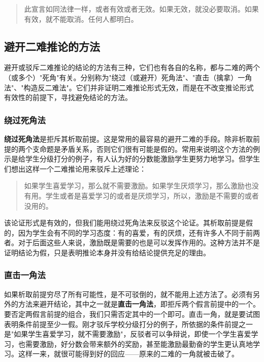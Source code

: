 \begin{quote}
此宣言如同法律一样，或者有效或者无效。如果无效，就没必要取消。如果有效，就不能取消。任何人都明白。\cite{lincoln1861}
\end{quote}

\subsection{避开二难推论的方法}

避开或驳斥二难推论的结论的方法有三种，它们也有各自的名称，都与二难的两个（或多个）"死角"有关。分别称为"绕过（或避开）死角法"、"直击（擒拿）一角法"、"构造反二难法"。它们并非证明二难推论形式无效，而是在不改变推论形式有效性的前提下，寻找避免结论的方法。

\subsubsection{绕过死角法}

\textbf{绕过死角法}是拒斥其析取前提。这是常用的最容易的避开二难的手段。除非析取前提的两个支命题是矛盾关系，否则它们很有可能是假的。常用来说明这个方法的例示是给学生分级打分的例子，有人认为好的分数能激励学生更努力地学习。但学生们想出这样一个二难推论用来驳斥上述理论：

\begin{quote}
如果学生喜爱学习，那么就不需要激励。如果学生厌烦学习，那么激励也没有用。学生或者是喜爱学习的或者是厌烦学习，所以，激励是不需要的或者没用的。
\end{quote}

该论证形式是有效的，但我们能用绕过死角法来反驳这个论证。其析取前提是假的，因为学生会有不同的学习态度：有的喜爱，有的厌烦，还有许多人不同于前两者。对于后面这些人来说，激励既是需要的也是可以发挥作用的。这种方法并不是证明结论为假，只是表明推论本身并没有给结论提供充足的理由。

\subsubsection{直击一角法}

如果析取前提穷尽了所有可能性，是不可驳倒的，就不能用上述方法了。必须有另外的方法来避开结论，其中之一就是\textbf{直击一角法}，即拒斥两个假言前提中的一个。要否定两假言前提的组合，我们只需否定其中的一个即可。直击一角，就是要试图表明条件前提至少一假。刚才驳斥学校分级打分的例子，所依据的条件前提之一是"如果学生喜爱学习，就不需要激励"，反驳者可以争辩说，即使一个学生喜爱学习，也需要激励，好分数会带来额外的奖励，甚至能激励最勤奋的学生更认真地学习。这样一来，就很可能得到好的回应——原来的二难的一角就被击破了。

